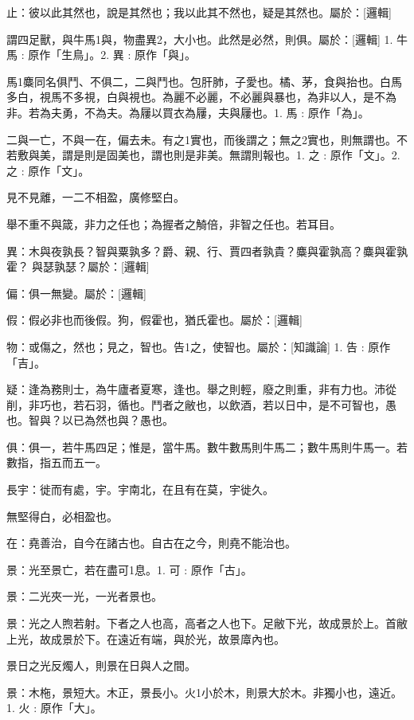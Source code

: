 
\begin{pinyinscope}
止：彼以此其然也，說是其然也；我以此其不然也，疑是其然也。屬於：[邏輯]

謂四足獸，與牛馬1與，物盡異2，大小也。此然是必然，則俱。屬於：[邏輯] 
1. 牛馬 : 原作「生鳥」。2. 異 : 原作「與」。

馬1麋同名俱鬥、不俱二，二與鬥也。包肝肺，子愛也。橘、茅，食與抬也。白馬多白，視馬不多視，白與視也。為麗不必麗，不必麗與暴也，為非以人，是不為非。若為夫勇，不為夫。為屨以買衣為屨，夫與屨也。1. 馬 : 原作「為」。

二與一亡，不與一在，偏去未。有之1實也，而後謂之；無之2實也，則無謂也。不若敷與美，謂是則是固美也，謂也則是非美。無謂則報也。1. 之 : 原作「文」。2. 之 : 原作「文」。

見不見離，一二不相盈，廣修堅白。

舉不重不與箴，非力之任也；為握者之觭倍，非智之任也。若耳目。

異：木與夜孰長？智與粟孰多？爵、親、行、賈四者孰貴？麋與霍孰高？麋與霍孰霍？𧈳與瑟孰瑟？屬於：[邏輯]

偏：俱一無變。屬於：[邏輯]

假：假必非也而後假。狗，假霍也，猶氏霍也。屬於：[邏輯]

物：或傷之，然也；見之，智也。告1之，使智也。屬於：[知識論] 
1. 告 : 原作「吉」。

疑：逢為務則士，為牛廬者夏寒，逢也。舉之則輕，廢之則重，非有力也。沛從削，非巧也，若石羽，循也。鬥者之敝也，以飲酒，若以日中，是不可智也，愚也。智與？以已為然也與？愚也。



俱：俱一，若牛馬四足；惟是，當牛馬。數牛數馬則牛馬二；數牛馬則牛馬一。若數指，指五而五一。

長宇：徙而有處，宇。宇南北，在且有在莫，宇徙久。



無堅得白，必相盈也。

在：堯善治，自今在諸古也。自古在之今，則堯不能治也。

景：光至景亡，若在盡可1息。1. 可 : 原作「古」。

景：二光夾一光，一光者景也。

景：光之人煦若射。下者之人也高，高者之人也下。足敝下光，故成景於上。首敝上光，故成景於下。在遠近有端，與於光，故景㢓內也。

景日之光反燭人，則景在日與人之間。

景：木柂，景短大。木正，景長小。火1小於木，則景大於木。非獨小也，遠近。1. 火 : 原作「大」。


\end{pinyinscope}
